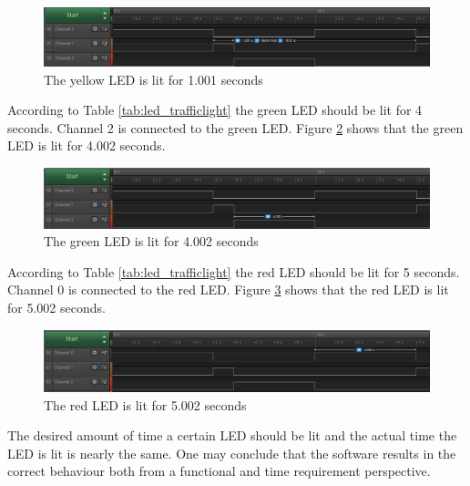 \begin{figure}[H]
    \centering

    \includegraphics[scale=0.43]{img/yellow.png}

    \caption{The yellow LED is lit for 1.001 seconds}
    \label{fig:yellow}

\end{figure}

According to Table \ref{tab:led_trafficlight} the green LED should be lit for 4 seconds.
Channel 2 is connected to the green LED. Figure \ref{fig:green} shows that the green LED is lit for 4.002 seconds.

\begin{figure}[H]
    \centering

    \includegraphics[scale=0.43]{img/green.png}

    \caption{The green LED is lit for 4.002 seconds}
    \label{fig:green}

\end{figure}

According to Table \ref{tab:led_trafficlight} the red LED should be lit for 5 seconds.
Channel 0 is connected to the red LED. Figure \ref{fig:red} shows that the red LED is lit for 5.002 seconds.

\begin{figure}[H]
    \centering

    \includegraphics[scale=0.43]{img/red.png}

    \caption{The red LED is lit for 5.002 seconds}
    \label{fig:red}

\end{figure}

The desired amount of time a certain LED should be lit and the actual time the LED is lit is nearly the same.
One may conclude that the software results in the correct behaviour both from a functional and time requirement perspective.
